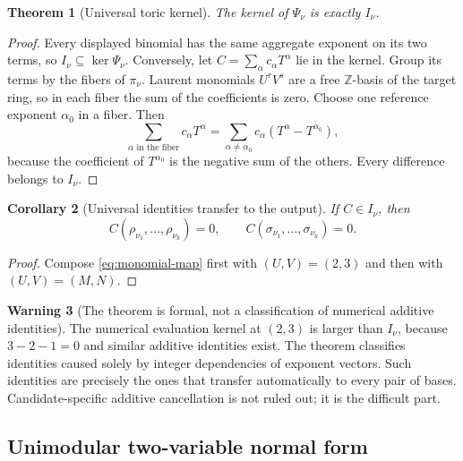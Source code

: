 \documentclass[11pt,oneside]{article}
\newtheorem{theorem}{Theorem}[section]
\newtheorem{corollary}[theorem]{Corollary}
\theoremstyle{definition}
\newtheorem{warning}[theorem]{Warning}
\theoremstyle{remark}
\newcommand{\Z}{\mathbb Z}
\begin{document}
\begin{theorem}[Universal toric kernel]
\label{thm:toric-kernel}
The kernel of $\Psi_\nu$ is exactly $I_\nu$.
\end{theorem}

\begin{proof}
Every displayed binomial has the same aggregate exponent on its two terms, so
$I_\nu\subseteq\ker\Psi_\nu$.  Conversely, let
$C=\sum_\alpha c_\alpha T^\alpha$ lie in the kernel.  Group its terms by the fibers of
$\pi_\nu$.  Laurent monomials $U^rV^s$ are a free $\Z$-basis of the target ring, so in each
fiber the sum of the coefficients is zero.  Choose one reference exponent $\alpha_0$ in a
fiber.  Then
\[
 \sum_{\alpha\text{ in the fiber}}c_\alpha T^\alpha
 =\sum_{\alpha\ne\alpha_0}c_\alpha
   (T^\alpha-T^{\alpha_0}),
\]
because the coefficient of $T^{\alpha_0}$ is the negative sum of the others.  Every
difference belongs to $I_\nu$.
\end{proof}

\begin{corollary}[Universal identities transfer to the output]
\label{cor:toric-transfer}
If $C\in I_\nu$, then
\begin{equation}
 C(\rho_{\nu_1},\ldots,\rho_{\nu_k})=0,
 \qquad
 C(\sigma_{\nu_1},\ldots,\sigma_{\nu_k})=0.
 \label{eq:toric-both}
\end{equation}
\end{corollary}

\begin{proof}
Compose \eqref{eq:monomial-map} first with $(U,V)=(2,3)$ and then with $(U,V)=(M,N)$.
\end{proof}

\begin{warning}[The theorem is formal, not a classification of numerical additive identities]
\label{warn:numeric-kernel}
The numerical evaluation kernel at $(2,3)$ is larger than $I_\nu$, because $3-2-1=0$ and
similar additive identities exist.  The theorem classifies identities caused solely by
integer dependencies of exponent vectors.  Such identities are precisely the ones that
transfer automatically to every pair of bases.  Candidate-specific additive cancellation is
not ruled out; it is the difficult part.
\end{warning}

\subsection{Unimodular two-variable normal form}
\end{document}
